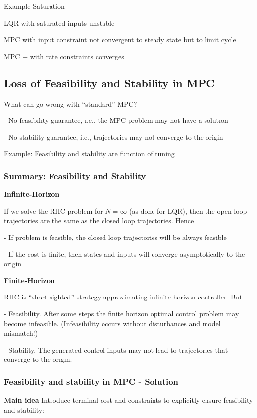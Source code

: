 Example Saturation

LQR with saturated inputs unstable

MPC with input constraint not convergent to steady state but to limit cycle

MPC + with rate constraints converges

\subsection{Loss of Feasibility and Stability in MPC}

What can go wrong with “standard” MPC?

- No feasibility guarantee, i.e., the MPC problem may not have a solution

- No stability guarantee, i.e., trajectories may not converge to the origin

Example: Feasibility and stability are function of tuning

\subsubsection{Summary: Feasibility and Stability}

\textbf{Infinite-Horizon}

If we solve the RHC problem for $N = \infty$ (as done for LQR), then the
open loop trajectories are the same as the closed loop trajectories. Hence

- If problem is feasible, the closed loop trajectories will be always feasible

- If the cost is finite, then states and inputs will converge asymptotically to
the origin

\textbf{Finite-Horizon}

RHC is “short-sighted” strategy approximating infinite horizon controller.
But

- Feasibility. After some steps the finite horizon optimal control problem
may become infeasible. (Infeasibility occurs without disturbances and
model mismatch!)

- Stability. The generated control inputs may not lead to trajectories that
converge to the origin.

\subsubsection{Feasibility and stability in MPC - Solution}

\textbf{Main idea} Introduce terminal cost and constraints to explicitly ensure
feasibility and stability:

